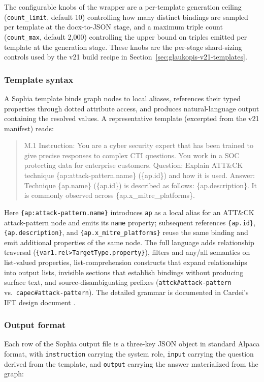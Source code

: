 \documentclass[unnumsec,webpdf,contemporary,large]{oup-authoring-template}
\theoremstyle{thmstyleone}
\theoremstyle{thmstyletwo}
\theoremstyle{thmstylethree}
\begin{document}
The configurable knobs of the wrapper are a per-template generation ceiling (\texttt{count\_limit}, default 10) controlling how many distinct bindings are sampled per template at the docx-to-JSON stage, and a maximum triple count (\texttt{count\_max}, default 2{,}000) controlling the upper bound on triples emitted per template at the generation stage. These knobs are the per-stage shard-sizing controls used by the v21 build recipe in Section~\ref{sec:glaukopis-v21-templates}.

\subsubsection*{Template syntax}
A Sophia template binds graph nodes to local aliases, references their typed properties through dotted attribute access, and produces natural-language output containing the resolved values. A representative template (excerpted from the v21 manifest) reads:

\begin{quote}\small\ttfamily
M.1 Instruction: You are a cyber security expert that has been trained to give precise responses to complex CTI questions. You work in a SOC protecting data for enterprise customers. Question: Explain ATT\&CK technique \{ap:attack-pattern.name\} (\{ap.id\}) and how it is used. Answer: Technique \{ap.name\} (\{ap.id\}) is described as follows: \{ap.description\}. It is commonly observed across \{ap.x\_mitre\_platforms\}.
\end{quote}

Here \verb|{ap:attack-pattern.name}| introduces \texttt{ap} as a local alias for an ATT\&CK attack-pattern node and emits its \texttt{name} property; subsequent references \verb|{ap.id}|, \verb|{ap.description}|, and \verb|{ap.x_mitre_platforms}| reuse the same binding and emit additional properties of the same node. The full language adds relationship traversal (\verb|{var1.rel>TargetType.property}|), filters and any/all semantics on list-valued properties, list-comprehension constructs that expand relationships into output lists, invisible sections that establish bindings without producing surface text, and source-disambiguating prefixes (\verb|attck#attack-pattern| vs.\ \verb|capec#attack-pattern|). The detailed grammar is documented in Cardei's IFT design document \cite{cardei2025ift}.

\subsubsection*{Output format}
Each row of the Sophia output file is a three-key JSON object in standard Alpaca format, with \texttt{instruction} carrying the system role, \texttt{input} carrying the question derived from the template, and \texttt{output} carrying the answer materialized from the graph:
\end{document}
